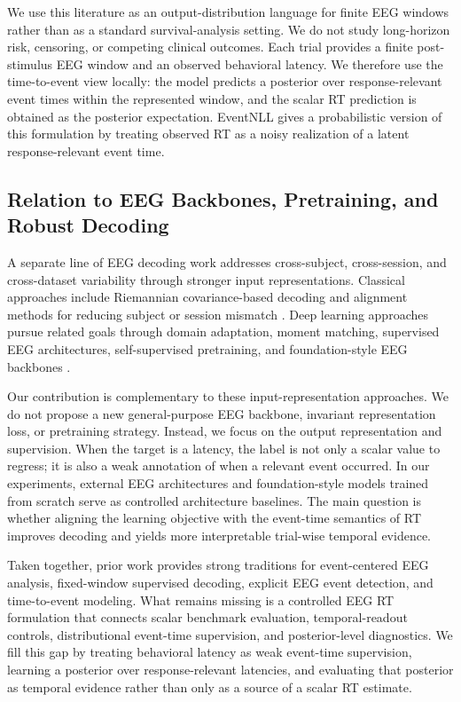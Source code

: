 \documentclass[12pt]{article}
\begin{document}
We use this literature as an output-distribution language for finite EEG windows rather than as a standard survival-analysis setting. We do not study long-horizon risk, censoring, or competing clinical outcomes. Each trial provides a finite post-stimulus EEG window and an observed behavioral latency. We therefore use the time-to-event view locally: the model predicts a posterior over response-relevant event times within the represented window, and the scalar RT prediction is obtained as the posterior expectation. EventNLL gives a probabilistic version of this formulation by treating observed RT as a noisy realization of a latent response-relevant event time.

\subsection{Relation to EEG Backbones, Pretraining, and Robust Decoding}
A separate line of EEG decoding work addresses cross-subject, cross-session, and cross-dataset variability through stronger input representations. Classical approaches include Riemannian covariance-based decoding and alignment methods for reducing subject or session mismatch \citep{Barachant2012RiemannianBCI,Jayaram2016TransferLearningBCI,Zanini2018RiemannianTL,HeWu2020EuclideanAlignment}. Deep learning approaches pursue related goals through domain adaptation, moment matching, supervised EEG architectures, self-supervised pretraining, and foundation-style EEG backbones \citep{Ganin2016DANN,SunSaenko2016DeepCORAL,Kostas2021BENDR,wang2024eegpt,Jiang2024LaBraM,Chen2024EEGFormer,Wang2025EEGMamba,ElOuahidi2025REVE,Yue2024BrainGPT}.

Our contribution is complementary to these input-representation approaches. We do not propose a new general-purpose EEG backbone, invariant representation loss, or pretraining strategy. Instead, we focus on the output representation and supervision. When the target is a latency, the label is not only a scalar value to regress; it is also a weak annotation of when a relevant event occurred. In our experiments, external EEG architectures and foundation-style models trained from scratch serve as controlled architecture baselines. The main question is whether aligning the learning objective with the event-time semantics of RT improves decoding and yields more interpretable trial-wise temporal evidence.

Taken together, prior work provides strong traditions for event-centered EEG analysis, fixed-window supervised decoding, explicit EEG event detection, and time-to-event modeling. What remains missing is a controlled EEG RT formulation that connects scalar benchmark evaluation, temporal-readout controls, distributional event-time supervision, and posterior-level diagnostics. We fill this gap by treating behavioral latency as weak event-time supervision, learning a posterior over response-relevant latencies, and evaluating that posterior as temporal evidence rather than only as a source of a scalar RT estimate.
\end{document}
